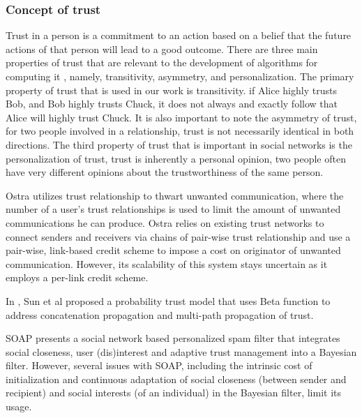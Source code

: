 \subsubsection{Concept of trust}

Trust in a person is a commitment to an action based on a belief that the future actions of that person will lead to a good outcome.
There are three main properties of trust that are relevant to the development of algorithms for computing it \cite{wang_trust-involved_2010},
	namely,
	transitivity,
	asymmetry,
	and personalization.
The primary property of trust that is used in our work is transitivity.
	if Alice highly trusts Bob,
	and Bob highly trusts Chuck,
	it does not always and exactly follow that Alice will highly trust Chuck.
It is also important to note the asymmetry of trust,
	for two people involved in a relationship,
	trust is not necessarily identical in both directions.
The third property of trust that is important in social networks is the personalization of trust,
	trust is inherently a personal opinion,
	two people often have very different opinions about the trustworthiness of the same person.

Ostra \cite{mislove_ostra:_2008} utilizes trust relationship to thwart unwanted communication,
	where the number of a user’s trust relationships is used to limit the amount of unwanted communications he can produce.
Ostra relies on existing trust networks to connect senders and receivers via chains of pair-wise trust relationship and use a pair-wise,
	link-based credit scheme to impose a cost on originator of unwanted communication.
However,
	its scalability of this system stays uncertain as it employs a per-link credit scheme.

%
In \cite{zeng_trust-aware_2014},
	Sun et al proposed a probability trust model that uses Beta function to address concatenation propagation and multi-path propagation of trust.


SOAP \cite{li_soap:_2011} presents a social network based personalized spam filter that integrates social closeness,
	user (dis)interest and adaptive trust management into a Bayesian filter.
However,
	several issues with SOAP,
	including the intrinsic cost of initialization and continuous adaptation of social closeness (between sender and recipient) 
		and social interests (of an individual) in the Bayesian filter,
	limit its usage.

